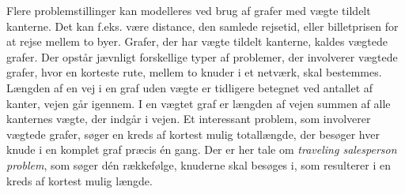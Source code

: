 Flere problemstillinger kan modelleres ved brug af grafer med vægte tildelt kanterne. 
Det kan f.eks. være distance, den samlede rejsetid, eller billetprisen for at rejse mellem to byer. 
Grafer, der har vægte tildelt kanterne, kaldes vægtede grafer. 
Der opstår jævnligt forskellige typer af problemer, der involverer vægtede grafer, hvor en korteste rute, mellem to knuder i et netværk, skal bestemmes. 
Længden af en vej i en graf uden vægte er tidligere betegnet ved antallet af kanter, vejen går igennem.
I en vægtet graf er længden af vejen summen af alle kanternes vægte, der indgår i vejen. 
Et interessant problem, som involverer vægtede grafer, søger en kreds af kortest mulig totallængde, der besøger hver knude i en komplet graf præcis én gang.
Der er her tale om \emph{traveling salesperson problem}, som søger dén rækkefølge, knuderne skal besøges i, som resulterer i en kreds af kortest mulig længde. 
